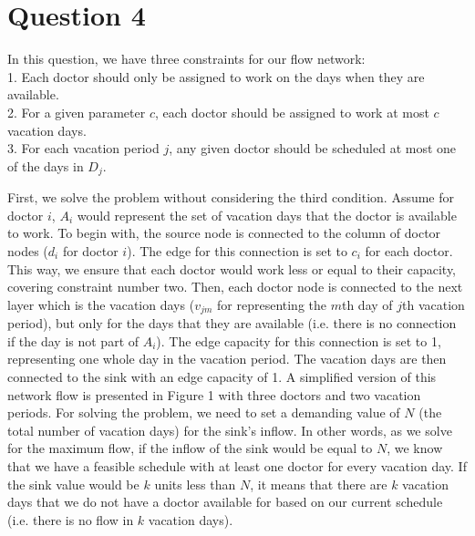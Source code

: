 \section{Question 4}

In this question, we have three constraints for our flow network:
\\ 1. Each doctor should only be assigned to work on the days when they are available.
\\ 2. For a given parameter $c$, each doctor should be assigned to work at most $c$ vacation days.
\\ 3. For each vacation period $j$, any given doctor should be scheduled at most one of the days in $D_j$. 

First, we solve the problem without considering the third condition. Assume for doctor $i$, $A_i$ would represent
the set of vacation days that the doctor is available to work. To begin with, the source node is connected to the column
of doctor nodes ($d_i$ for doctor $i$). The edge for this connection is set to $c_i$ for each doctor. This way, we ensure that each doctor
would work less or equal to their capacity, covering constraint number two. Then, each doctor node is connected to the next layer which is the vacation
days ($v_{jm}$ for representing the $m$th day of $j$th vacation period), but only for the days that they are available (i.e. there is no connection if
the day is not part of $A_i$). The edge capacity for this connection is set to 1, representing one whole day in the vacation period.
The vacation days are then connected to the sink with an edge capacity of 1. A simplified version of this network flow is presented in Figure 1 with three doctors 
and two vacation periods. For solving the problem, we need to set a demanding value of $N$ (the total number of vacation days) for the sink's inflow. In other words, as we solve for the
maximum flow, if the inflow of the sink would be equal to $N$, we know that we have a feasible schedule with at least one doctor for every vacation day. If the sink value would be $k$ units less than $N$, it means
that there are $k$ vacation days that we do not have a doctor available for based on our current schedule (i.e. there is no flow in $k$ vacation days). 

